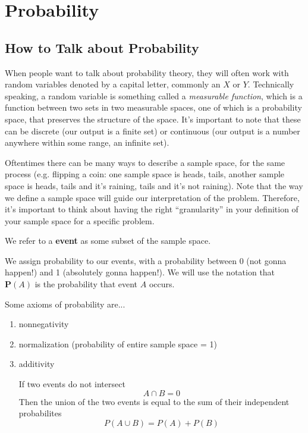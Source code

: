 \documentclass{article}
\begin{document}
\section{Probability}

\subsection{How to Talk about Probability}
When people want to talk about probability theory, they will often work with random variables denoted by a capital letter, commonly an $X$ or $Y$. Technically speaking, a random variable is something called a \textit{measurable function}, which is a function between two sets in two measurable spaces, one of which is a probability space, that preserves the structure of the space. It's important to note that these can be discrete (our output is a finite set) or continuous (our output is a number anywhere within some range, an infinite set).

Oftentimes there can be many ways to describe a sample space, for the same process (e.g. flipping a coin: one sample space is {heads, tails}, another sample space is {heads, tails and it's raining, tails and it's not raining}). Note that the way we define a sample space will guide our interpretation of the problem. Therefore, it's important to think about having the right ``granularity'' in your definition of your sample space for a specific problem. 

We refer to a \textbf{event} as some subset of the sample space.

We assign probability to our events, with a probability between 0 (not gonna happen!) and 1 (absolutely gonna happen!). We will use the notation that $\mathbf{P}(A)$ is the probability that event $A$ occurs. 

Some axioms of probability are... 
\begin{enumerate}
\item\label{item:2} nonnegativity
\item normalization (probability of entire sample space = 1)
\item additivity

If two events do not intersect
\begin{equation}
\label{eq:3}
A \cap B = 0 %
\end{equation}
Then the union of the two events is equal to the sum of their independent probabilites
\begin{equation}
\label{eq:2}
P(A \cup B) = P(A) + P(B) %
\end{equation}
\end{enumerate}
\end{document}
